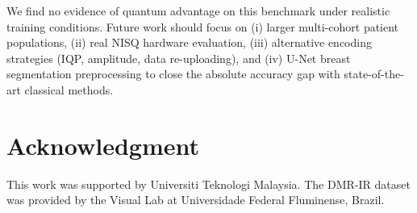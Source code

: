 \documentclass[conference]{IEEEtran}
\begin{document}
We find no evidence of quantum advantage on this benchmark under realistic training conditions. Future work should focus on (i) larger multi-cohort patient populations, (ii) real NISQ hardware evaluation, (iii) alternative encoding strategies (IQP, amplitude, data re-uploading), and (iv) U-Net breast segmentation preprocessing to close the absolute accuracy gap with state-of-the-art classical methods.

\section*{Acknowledgment}
This work was supported by Universiti Teknologi Malaysia. The DMR-IR dataset was provided by the Visual Lab at Universidade Federal Fluminense, Brazil.
\end{document}
